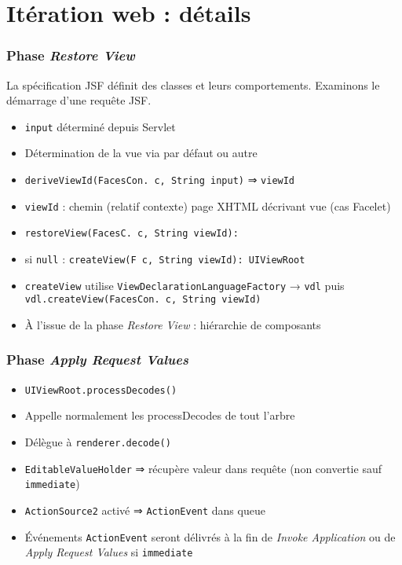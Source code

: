 \documentclass[english, french]{beamer}
\begin{document}
\section{Itération web : détails}
\begin{frame}[label=ph-rv-details]
	\frametitle{Phase \emph{Restore View}}
	La spécification JSF définit des classes et leurs comportements. Examinons le démarrage d’une requête JSF.
	\begin{itemize}
		\item \texttt{input} déterminé depuis Servlet %
		\item Détermination de la vue via  par défaut {\tiny ou autre}
		\item \texttt{deriveViewId(FacesCon. c, String input)} ⇒ \texttt{viewId}
		\item \texttt{viewId} : chemin {\tiny (relatif contexte)} page XHTML décrivant vue {\tiny (cas Facelet)}
		\item \texttt{restoreView(FacesC. c, String viewId): }
		\item si \texttt{null} : \texttt{createView(F c, String viewId): UIViewRoot}
		\item \texttt{createView} utilise \texttt{ViewDeclarationLanguageFactory} → \texttt{vdl} puis \texttt{vdl.createView(FacesCon. c, String viewId)}
		\item À l’issue de la phase \emph{Restore View} : hiérarchie de composants
	\end{itemize}
\end{frame}

\begin{frame}[label=ph-arv-details]
	\frametitle{Phase \emph{Apply Request Values}}
	\begin{itemize}
		\item \texttt{UIViewRoot.processDecodes()}
		\item Appelle {\tiny normalement} les processDecodes de tout l’arbre
		\item Délègue à \texttt{renderer.decode()}%
		\item \texttt{EditableValueHolder} ⇒ récupère valeur dans requête (non convertie {\tiny sauf \texttt{immediate}})
		\item \texttt{ActionSource2} activé ⇒ \texttt{ActionEvent} dans queue
		\item Événements \texttt{ActionEvent} seront délivrés à la fin de \emph{Invoke Application} {\tiny ou de \emph{Apply Request Values} si \texttt{immediate}}
	\end{itemize}
\end{frame}
\end{document}
